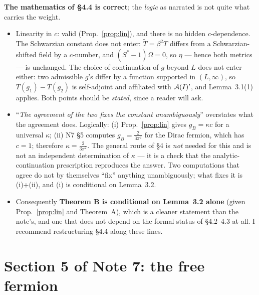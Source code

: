 \documentclass[11pt]{article}
\begin{document}
\begin{verdictgap}
\textbf{The mathematics of \S4.4 is correct}; the \emph{logic} as narrated is not quite what carries the weight.
\begin{itemize}[leftmargin=1.5em]
\item Linearity in $c$: valid (Prop.~\ref{prop:lin}), and there is no hidden $c$-dependence.  The Schwarzian
constant does not enter: $\widetilde T=\beta^2T$ differs from a Schwarzian-shifted field by a $c$-number, and
$(S^*-1)\Omega=0$, so $\eta$ --- hence both metrics --- is unchanged.  The choice of continuation of $g$ beyond
$L$ does not enter either: two admissible $g$'s differ by a function supported in $(L,\infty)$, so
$T(g_1)-T(g_2)$ is self-adjoint and affiliated with $\mathcal A(I)'$, and Lemma~3.1(1) applies.  Both points should be
\emph{stated}, since a reader will ask.
\item ``\emph{The agreement of the two fixes the constant unambiguously}'' overstates what the agreement does.
Logically: (i) Prop.~\ref{prop:lin} gives $g_B=\kappa c$ for a universal $\kappa$; (ii) N7 \S5 computes
$g_B=\frac2{3\pi^2}$ for the Dirac fermion, which has $c=1$; therefore $\kappa=\frac2{3\pi^2}$.  The general
route of \S4 is \emph{not} needed for this and is not an independent determination of $\kappa$ --- it is a check
that the analytic-continuation prescription reproduces the answer.  Two computations that agree do not by
themselves ``fix'' anything unambiguously; what fixes it is (i)+(ii), and (i) is conditional on Lemma~3.2.
\item Consequently \textbf{Theorem B is conditional on Lemma~3.2 alone} (given Prop.~\ref{prop:lin} and
Theorem~A), which is a cleaner statement than the note's, and one that does not depend on the formal status of
\S4.2--4.3 at all.  I recommend restructuring \S4.4 along these lines.
\end{itemize}
\end{verdictgap}

\section{Section 5 of Note 7: the free fermion}\label{sec:fermion5}
\end{document}
